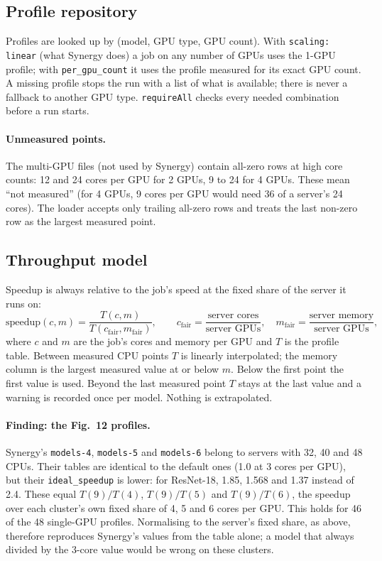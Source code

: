 \documentclass[11pt,a4paper]{article}
\newcommand{\code}[1]{\texttt{#1}}
\begin{document}
\subsection{Profile repository}
Profiles are looked up by (model, GPU type, GPU count). With \code{scaling: linear} (what Synergy
does) a job on any number of GPUs uses the 1-GPU profile; with \code{per\_gpu\_count} it uses the
profile measured for its exact GPU count. A missing profile stops the run with a list of what is
available; there is never a fallback to another GPU type. \code{requireAll} checks every needed
combination before a run starts.

\paragraph{Unmeasured points.} The multi-GPU files (not used by Synergy) contain all-zero rows at
high core counts: 12 and 24 cores per GPU for 2 GPUs, 9 to 24 for 4 GPUs. These mean ``not measured''
(for 4 GPUs, 9 cores per GPU would need 36 of a server's 24 cores). The loader accepts only trailing
all-zero rows and treats the last non-zero row as the largest measured point.

\subsection{Throughput model}
Speedup is always relative to the job's speed at the fixed share of the server it runs on:
\[
  \text{speedup}(c, m) = \frac{T(c, m)}{T(c_\text{fair}, m_\text{fair})}, \qquad
  c_\text{fair} = \frac{\text{server cores}}{\text{server GPUs}}, \quad
  m_\text{fair} = \frac{\text{server memory}}{\text{server GPUs}},
\]
where $c$ and $m$ are the job's cores and memory per GPU and $T$ is the profile table. Between
measured CPU points $T$ is linearly interpolated; the memory column is the largest measured value at
or below $m$. Below the first point the first value is used. Beyond the last measured point $T$ stays
at the last value and a warning is recorded once per model. Nothing is extrapolated.

\paragraph{Finding: the Fig.~12 profiles.} Synergy's \code{models-4}, \code{models-5} and
\code{models-6} belong to servers with 32, 40 and 48 CPUs. Their tables are identical to the default
ones (1.0 at 3 cores per GPU), but their \code{ideal\_speedup} is lower: for ResNet-18, 1.85, 1.568
and 1.37 instead of 2.4. These equal $T(9)/T(4)$, $T(9)/T(5)$ and $T(9)/T(6)$, the speedup over each
cluster's own fixed share of 4, 5 and 6 cores per GPU. This holds for 46 of the 48 single-GPU
profiles. Normalising to the server's fixed share, as above, therefore reproduces Synergy's values
from the table alone; a model that always divided by the 3-core value would be wrong on these
clusters.
\end{document}

